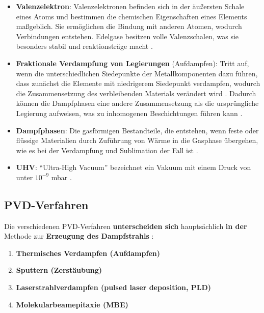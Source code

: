 \documentclass{article} %
\begin{document}
\begin{itemize}
    \item \textbf{Valenzelektron}: Valenzelektronen befinden sich in der äußersten Schale eines Atoms und bestimmen die chemischen Eigenschaften eines Elements maßgeblich. Sie ermöglichen die Bindung mit anderen Atomen, wodurch Verbindungen entstehen. Edelgase besitzen volle Valenzschalen, was sie besonders stabil und reaktionsträge macht \cite{petrucci_general_chemistry, chang_chemistry, brown_chemistry_textbook}.
    \item \textbf{Fraktionale Verdampfung von Legierungen} (Aufdampfen): Tritt auf, wenn die unterschiedlichen Siedepunkte der Metallkomponenten dazu führen, dass zunächst die Elemente mit niedrigerem Siedepunkt verdampfen, wodurch die Zusammensetzung des verbleibenden Materials verändert wird \cite{harvard_mrsec, vem_guide}. Dadurch können die Dampfphasen eine andere Zusammensetzung als die ursprüngliche Legierung aufweisen, was zu inhomogenen Beschichtungen führen kann \cite{frontiers_mpea, mdpi_vacuum_distillation}.
    \item \textbf{Dampfphasen}: Die gasförmigen Bestandteile, die entstehen, wenn feste oder flüssige Materialien durch Zuführung von Wärme in die Gasphase übergehen, wie es bei der Verdampfung und Sublimation der Fall ist \cite{thermopedia, thoughtco, opentextbc}.
    \item \textbf{UHV}: ``Ultra-High Vacuum'' bezeichnet ein Vakuum mit einem Druck von unter \(10^{-9}\) mbar \cite{atkins_physical_chemistry, ohring2002, smith1995}.
\end{itemize}





\vspace{1em}

\subsection{PVD-Verfahren} %

Die verschiedenen PVD-Verfahren \textbf{unterscheiden sich} hauptsächlich \textbf{in der} Methode zur \textbf{Erzeugung des Dampfstrahls} \cite{keplinger2024}:

\begin{enumerate}
    \item \textbf{Thermisches Verdampfen (Aufdampfen)}
    \item \textbf{Sputtern (Zerstäubung)}
    \item \textbf{Laserstrahlverdampfen (pulsed laser deposition, PLD)}
    \item \textbf{Molekularbeamepitaxie (MBE)}
\end{enumerate}
\end{document}
